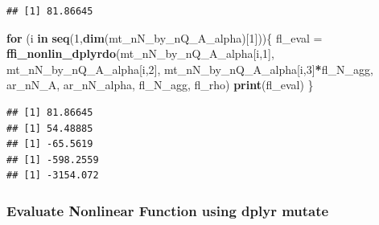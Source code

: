 \documentclass[
]{book}
\newenvironment{Shaded}{\begin{snugshade}}{\end{snugshade}}
\newcommand{\ControlFlowTok}[1]{\textcolor[rgb]{0.13,0.29,0.53}{\textbf{#1}}}
\newcommand{\DecValTok}[1]{\textcolor[rgb]{0.00,0.00,0.81}{#1}}
\newcommand{\KeywordTok}[1]{\textcolor[rgb]{0.13,0.29,0.53}{\textbf{#1}}}
\newcommand{\NormalTok}[1]{#1}
\newcommand{\OperatorTok}[1]{\textcolor[rgb]{0.81,0.36,0.00}{\textbf{#1}}}
\newcommand{\StringTok}[1]{\textcolor[rgb]{0.31,0.60,0.02}{#1}}
\begin{document}
\begin{verbatim}
## [1] 81.86645
\end{verbatim}

\begin{Shaded}
\begin{Highlighting}[]
\ControlFlowTok{for}\NormalTok{ (i }\ControlFlowTok{in} \KeywordTok{seq}\NormalTok{(}\DecValTok{1}\NormalTok{,}\KeywordTok{dim}\NormalTok{(mt\_nN\_by\_nQ\_A\_alpha)[}\DecValTok{1}\NormalTok{]))\{}
\NormalTok{  fl\_eval =}\StringTok{ }\KeywordTok{ffi\_nonlin\_dplyrdo}\NormalTok{(mt\_nN\_by\_nQ\_A\_alpha[i,}\DecValTok{1}\NormalTok{],}
\NormalTok{                               mt\_nN\_by\_nQ\_A\_alpha[i,}\DecValTok{2}\NormalTok{],}
\NormalTok{                               mt\_nN\_by\_nQ\_A\_alpha[i,}\DecValTok{3}\NormalTok{]}\OperatorTok{*}\NormalTok{fl\_N\_agg,}
\NormalTok{                               ar\_nN\_A, ar\_nN\_alpha, fl\_N\_agg, fl\_rho)}
  \KeywordTok{print}\NormalTok{(fl\_eval)}
\NormalTok{\}}
\end{Highlighting}
\end{Shaded}

\begin{verbatim}
## [1] 81.86645
## [1] 54.48885
## [1] -65.5619
## [1] -598.2559
## [1] -3154.072
\end{verbatim}

\hypertarget{evaluate-nonlinear-function-using-dplyr-mutate}{%
\subsubsection{Evaluate Nonlinear Function using dplyr mutate}\label{evaluate-nonlinear-function-using-dplyr-mutate}}
\end{document}
